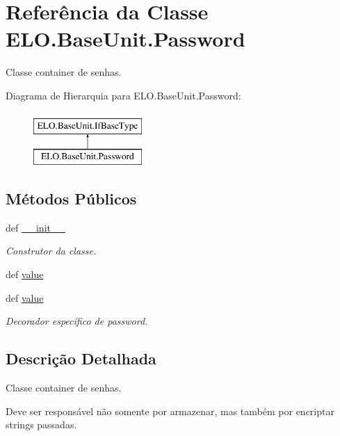 \hypertarget{classELO_1_1BaseUnit_1_1Password}{\section{Referência da Classe E\-L\-O.\-Base\-Unit.\-Password}
\label{classELO_1_1BaseUnit_1_1Password}
}


Classe container de senhas.  


Diagrama de Hierarquia para E\-L\-O.\-Base\-Unit.\-Password\-:\begin{figure}[H]
\begin{center}
\leavevmode
\includegraphics[height=2.000000cm]{d4/df5/classELO_1_1BaseUnit_1_1Password}
\end{center}
\end{figure}
\subsection*{Métodos Públicos}
\begin{DoxyCompactItemize}
\item 
def \hyperlink{classELO_1_1BaseUnit_1_1Password_a01568369a90b21117ba3beb05cbf9dfe}{\-\_\-\-\_\-init\-\_\-\-\_\-}
\begin{DoxyCompactList}\small\item\em Construtor da classe. \end{DoxyCompactList}\item 
def \hyperlink{classELO_1_1BaseUnit_1_1Password_a42dcd63788a2eed3780c39f368356546}{value}
\item 
def \hyperlink{classELO_1_1BaseUnit_1_1Password_a42dcd63788a2eed3780c39f368356546}{value}
\begin{DoxyCompactList}\small\item\em Decorador específico de password. \end{DoxyCompactList}\end{DoxyCompactItemize}


\subsection{Descrição Detalhada}
Classe container de senhas. 

Deve ser responsável não somente por armazenar, mas também por encriptar strings passadas. 

